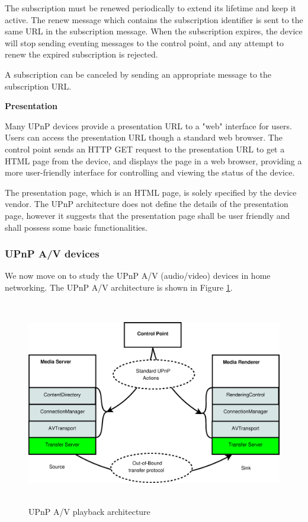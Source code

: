 The subscription must be renewed periodically to extend its lifetime and keep it active. The renew 
message which contains the subscription identifier is sent to the same URL in the subscription 
message. When the subscription expires, the device will stop sending eventing messages to the 
control point, and any attempt to renew the expired subscription is rejected.

A subscription can be canceled by sending an appropriate message to the
subscription URL.

\textbf{Presentation}

Many UPnP devices provide a presentation URL to a "web" interface for users. Users can access the 
presentation URL though a standard web browser. The control point sends an HTTP GET request to the 
presentation URL to get a HTML page from the device, and displays the page in a web browser, 
providing a more user-friendly interface for controlling and viewing the status
of the device.

The presentation page, which is an HTML page, is solely specified by the device vendor.
The UPnP architecture does not define the details of the presentation page,
however it suggests that the presentation page shall be user friendly and shall
possess some basic functionalities.
\subsubsection{UPnP A/V devices\label{2_2_1_2}}
We now move on to study the UPnP A/V (audio/video) devices in home
networking\label{upnpav}. The UPnP A/V architecture is shown in Figure
\ref{upnp_playback}.

\begin{figure}[hb] 
\centering \includegraphics[height=9cm]{charts/upnp_playback} 
\caption{UPnP A/V playback architecture \label{upnp_playback}} 
\end{figure}

